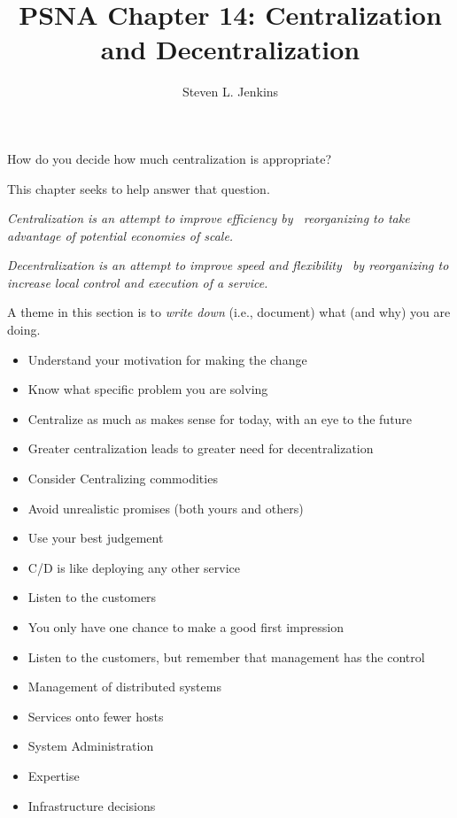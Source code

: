\documentclass{slides}
\title{PSNA Chapter 14: Centralization and Decentralization}
\author{Steven L. Jenkins}
\newcommand{\bi}{\begin{itemize}}
\newcommand{\ei}{\end{itemize}}
\begin{document}

How do you decide how much centralization is appropriate?

This chapter seeks to help answer that question.


\emph{Centralization is an attempt to improve efficiency by \
reorganizing to take advantage of potential economies of scale.}

\emph{Decentralization is an attempt to improve speed and flexibility \
by reorganizing to increase local control and execution of a service.}

\slide{The Basics}

A theme in this section is to \emph{write down} (i.e., document)
what (and why) you are doing.

\bi
\item Understand your motivation for making the change
\item Know what specific problem you are solving
\item Centralize as much as makes sense for today, with an
  eye to the future
\item Greater centralization leads to greater need for
  decentralization
\item Consider Centralizing commodities
\ei


\bi
\item Avoid unrealistic promises (both yours and others)
\item Use your best judgement
\item C/D is like deploying any other service
\item Listen to the customers
\item You only have one chance to make a good first impression
\item Listen to the customers, but remember that management has the control
\ei


\bi
\item Management of distributed systems
\item Services onto fewer hosts
\item System Administration
\item Expertise
\item Infrastructure decisions
\ei

\end{document}
